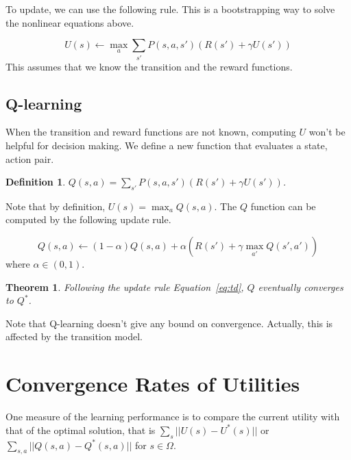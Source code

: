 \documentclass[10pt]{article}
\newtheorem{definition}{Definition}
\newtheorem{theorem}{Theorem}
\begin{document}
To update, we can use the following rule. This is a bootstrapping way to solve
the nonlinear equations above.

\begin{equation}\label{eq:vl}
U(s) \leftarrow \max_a \sum_{s'} P(s, a, s') (R(s') + \gamma U(s'))
\end{equation} 
This assumes that we know the transition and the reward functions.

\subsection{Q-learning}

When the transition and reward functions are not known, computing $U$ won't be
helpful for decision making. We define a new function that evaluates a state,
action pair.

\begin{definition}
$Q(s, a) = \sum_{s'} P(s, a, s') (R(s') + \gamma U(s'))$.
\end{definition}
Note that by definition, $U(s) = \max_a Q(s, a)$. The $Q$ function can be
computed by the following update rule.

\begin{equation}\label{eq:td}
Q(s, a) \leftarrow (1 - \alpha) Q(s, a) + \alpha (R(s') + \gamma \max_{a'} Q(s',
a'))
\end{equation} 
where $\alpha \in (0, 1)$. 

\begin{theorem}
Following the update rule Equation~\ref{eq:td}, $Q$ eventually converges to $Q^*$.
\cite{rl}
\end{theorem}

Note that Q-learning doesn't give any bound on convergence. Actually, this is
affected by the transition model.

\section{Convergence Rates of Utilities}

One measure of the learning performance is to compare the current utility with
that of the optimal solution, that is $\sum_s ||U(s) - U^*(s)||$ or $\sum_{s,a}
||Q(s, a) - Q^*(s, a)||$ for $s \in \Omega$.
\end{document}
